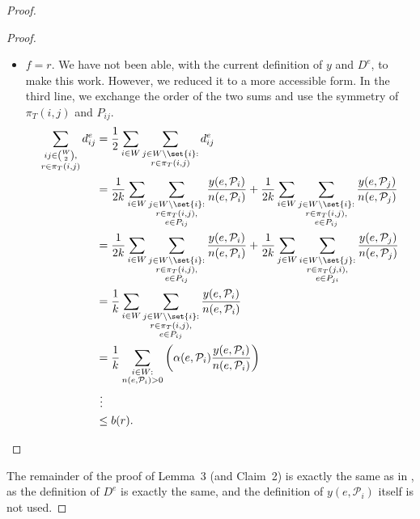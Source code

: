 \begin{proof}
\begin{proof}
\begin{itemize}
            \item $f = r$.
            We have not been able, with the current definition of $y$ and $D^e$, to make this work.
            However, we reduced it to a more accessible form.
            In the third line, we exchange the order of the two sums and use the symmetry of $\pi_T(i, j)$ and $P_{ij}$.
            \[
                \begin{split}
                    \sum_{\substack{ij \in \binom{W}{2},\\r \in \pi_T(i,j)}} d^e_{ij} &= \frac 1 2 \sum_{i \in W} \sum_{\substack{j \in W \setminus \set{i}:\\r \in \pi_T(i,j)}} d^e_{ij} \\
                    &= \frac{1}{2k} \sum_{i \in W} \sum_{\substack{j \in W \setminus \set{i}:\\r \in \pi_T(i,j),\\e \in P_{ij}}} \frac{y(e, \mathcal P_i)}{n(e, \mathcal P_i)} + \frac{1}{2k} \sum_{i \in W} \sum_{\substack{j \in W \setminus \set{i}:\\r \in \pi_T(i,j),\\e \in P_{ij}}} \frac{y(e, \mathcal P_j)}{n(e, \mathcal P_j)} \\
                    &= \frac{1}{2k} \sum_{i \in W} \sum_{\substack{j \in W \setminus \set{i}:\\r \in \pi_T(i,j),\\e \in P_{ij}}} \frac{y(e, \mathcal P_i)}{n(e, \mathcal P_i)} + \frac{1}{2k} \sum_{j \in W} \sum_{\substack{i \in W \setminus \set{j}:\\r \in \pi_T(j,i),\\e \in P_{ji}}} \frac{y(e, \mathcal P_j)}{n(e, \mathcal P_j)} \\
                    &= \frac{1}{k} \sum_{i \in W} \sum_{\substack{j \in W \setminus \set{i}:\\r \in \pi_T(i,j),\\e \in P_{ij}}} \frac{y(e, \mathcal P_i)}{n(e, \mathcal P_i)} \\
                    &= \frac{1}{k} \sum_{\substack{i \in W:\\n(e, \mathcal P_i) > 0}} \left( \alpha(e, \mathcal P_i) \frac{y(e, \mathcal P_i)}{n(e, \mathcal P_i)} \right) \\
                    &\ \vdots\\
                    &\le b(r).
                \end{split}
            \] \qedhere
        \end{itemize}

    \end{proof}
    The remainder of the proof of Lemma~3 (and Claim~2) is exactly the same as in \cite{grandoni2008short}, as the definition of $D^e$ is exactly the same, and the definition of $y(e, \mathcal P_i)$ itself is not used.
\end{proof}


